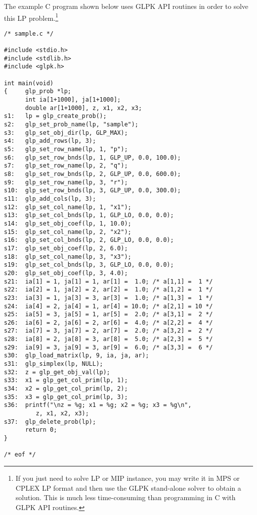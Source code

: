 The example C program shown below uses GLPK API routines in order to
solve this LP problem.\footnote{If you just need to solve LP or MIP
instance, you may write it in MPS or CPLEX LP format and then use the
GLPK stand-alone solver to obtain a solution. This is much less
time-consuming than programming in C with GLPK API routines.}

\begin{footnotesize}
\begin{verbatim}
/* sample.c */

#include <stdio.h>
#include <stdlib.h>
#include <glpk.h>

int main(void)
{     glp_prob *lp;
      int ia[1+1000], ja[1+1000];
      double ar[1+1000], z, x1, x2, x3;
s1:   lp = glp_create_prob();
s2:   glp_set_prob_name(lp, "sample");
s3:   glp_set_obj_dir(lp, GLP_MAX);
s4:   glp_add_rows(lp, 3);
s5:   glp_set_row_name(lp, 1, "p");
s6:   glp_set_row_bnds(lp, 1, GLP_UP, 0.0, 100.0);
s7:   glp_set_row_name(lp, 2, "q");
s8:   glp_set_row_bnds(lp, 2, GLP_UP, 0.0, 600.0);
s9:   glp_set_row_name(lp, 3, "r");
s10:  glp_set_row_bnds(lp, 3, GLP_UP, 0.0, 300.0);
s11:  glp_add_cols(lp, 3);
s12:  glp_set_col_name(lp, 1, "x1");
s13:  glp_set_col_bnds(lp, 1, GLP_LO, 0.0, 0.0);
s14:  glp_set_obj_coef(lp, 1, 10.0);
s15:  glp_set_col_name(lp, 2, "x2");
s16:  glp_set_col_bnds(lp, 2, GLP_LO, 0.0, 0.0);
s17:  glp_set_obj_coef(lp, 2, 6.0);
s18:  glp_set_col_name(lp, 3, "x3");
s19:  glp_set_col_bnds(lp, 3, GLP_LO, 0.0, 0.0);
s20:  glp_set_obj_coef(lp, 3, 4.0);
s21:  ia[1] = 1, ja[1] = 1, ar[1] =  1.0; /* a[1,1] =  1 */
s22:  ia[2] = 1, ja[2] = 2, ar[2] =  1.0; /* a[1,2] =  1 */
s23:  ia[3] = 1, ja[3] = 3, ar[3] =  1.0; /* a[1,3] =  1 */
s24:  ia[4] = 2, ja[4] = 1, ar[4] = 10.0; /* a[2,1] = 10 */
s25:  ia[5] = 3, ja[5] = 1, ar[5] =  2.0; /* a[3,1] =  2 */
s26:  ia[6] = 2, ja[6] = 2, ar[6] =  4.0; /* a[2,2] =  4 */
s27:  ia[7] = 3, ja[7] = 2, ar[7] =  2.0; /* a[3,2] =  2 */
s28:  ia[8] = 2, ja[8] = 3, ar[8] =  5.0; /* a[2,3] =  5 */
s29:  ia[9] = 3, ja[9] = 3, ar[9] =  6.0; /* a[3,3] =  6 */
s30:  glp_load_matrix(lp, 9, ia, ja, ar);
s31:  glp_simplex(lp, NULL);
s32:  z = glp_get_obj_val(lp);
s33:  x1 = glp_get_col_prim(lp, 1);
s34:  x2 = glp_get_col_prim(lp, 2);
s35:  x3 = glp_get_col_prim(lp, 3);
s36:  printf("\nz = %g; x1 = %g; x2 = %g; x3 = %g\n",
         z, x1, x2, x3);
s37:  glp_delete_prob(lp);
      return 0;
}

/* eof */
\end{verbatim}
\end{footnotesize}

